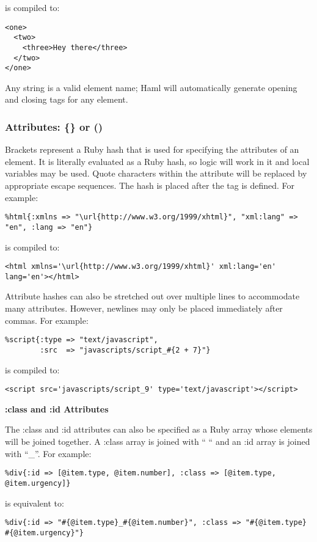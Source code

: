 \documentclass[10pt]{article}
\begin{document}
 is compiled to:
\begin{verbatim}
<one>
  <two>
    <three>Hey there</three>
  </two>
</one>
\end{verbatim}


 Any string is a valid element name; Haml will automatically generate opening and closing tags for any element.
\subsubsection*{Attributes: \{\} or ()}


 Brackets represent a Ruby hash that is used for specifying the attributes of an element. It is literally evaluated as a Ruby hash, so logic will work in it and local variables may be used. Quote characters within the attribute will be replaced by appropriate escape sequences. The hash is placed after the tag is defined. For example:
\begin{verbatim}
%html{:xmlns => "\url{http://www.w3.org/1999/xhtml}", "xml:lang" => "en", :lang => "en"}
\end{verbatim}


 is compiled to:
\begin{verbatim}
<html xmlns='\url{http://www.w3.org/1999/xhtml}' xml:lang='en' lang='en'></html>
\end{verbatim}


 Attribute hashes can also be stretched out over multiple lines to accommodate many attributes. However, newlines may only be placed immediately after commas. For example:
\begin{verbatim}
%script{:type => "text/javascript",
        :src  => "javascripts/script_#{2 + 7}"}
\end{verbatim}


 is compiled to:
\begin{verbatim}
<script src='javascripts/script_9' type='text/javascript'></script>
\end{verbatim}
\textbf{:class and :id Attributes}


 The :class and :id attributes can also be specified as a Ruby array whose elements will be joined together. A :class array is joined with `` `` and an :id array is joined with ``\_''. For example:
\begin{verbatim}
%div{:id => [@item.type, @item.number], :class => [@item.type, @item.urgency]}
\end{verbatim}


 is equivalent to:
\begin{verbatim}
%div{:id => "#{@item.type}_#{@item.number}", :class => "#{@item.type} #{@item.urgency}"}
\end{verbatim}
\end{document}
